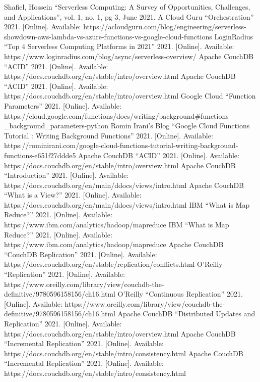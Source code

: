 \documentclass[10pt, conference]{IEEEtran}
\begin{document}
\begin{thebibliography}{00}
 Shafiel, Hossein ``Serverless Computing: A Survey of Opportunities,
Challenges, and Applications'', vol. 1, no. 1, pg 3, June 2021. 
 A Cloud Guru ``Orchestration” 2021. [Online]. Available: https://acloudguru.com/blog/engineering/serverless-showdown-aws-lambda-vs-azure-functions-vs-google-cloud-functions
 LoginRadius ``Top 4 Serverless Computing Platforms in 2021” 2021. [Online]. Available:  https://www.loginradius.com/blog/async/serverless-overview/
 Apache CouchDB ``ACID” 2021. [Online]. Available:  https://docs.couchdb.org/en/stable/intro/overview.html 
 Apache CouchDB ``ACID” 2021. [Online]. Available:  https://docs.couchdb.org/en/stable/intro/overview.html 
 Google Cloud ``Function Parameters” 2021. [Online]. Available:  https://cloud.google.com/functions/docs/writing/background\#functions \_background\_parameters-python
 Romin Irani’s Blog ``Google Cloud Functions Tutorial : Writing Background Functions” 2021. [Online]. Available:  https://rominirani.com/google-cloud-functions-tutorial-writing-background-functions-e651f27ddde5
 Apache CouchDB “ACID” 2021. [Online]. Available:  https://docs.couchdb.org/en/stable/intro/overview.html 
 Apache CouchDB “Introduction” 2021. [Online]. Available: https://docs.couchdb.org/en/main/ddocs/views/intro.html
 Apache CouchDB “What is a View?” 2021. [Online]. Available: https://docs.couchdb.org/en/main/ddocs/views/intro.html
 IBM “What is Map Reduce?” 2021. [Online]. Available: https://www.ibm.com/analytics/hadoop/mapreduce
 IBM “What is Map Reduce?” 2021. [Online]. Available: https://www.ibm.com/analytics/hadoop/mapreduce
 Apache CouchDB “CouchDB Replication” 2021. [Online]. Available: https://docs.couchdb.org/en/stable/replication/conflicts.html
 O'Reilly “Replication” 2021. [Online]. Available:  https://www.oreilly.com/library/view/couchdb-the-definitive/9780596158156/ch16.html 
 O'Reilly “Continuous Replication” 2021. [Online]. Available: https://www.oreilly.com/library/view/couchdb-the-definitive/9780596158156/ch16.html 
 Apache CouchDB “Distributed Updates and Replication” 2021. [Online]. Available: https://docs.couchdb.org/en/stable/intro/overview.html
 Apache CouchDB “Incremental Replication” 2021. [Online]. Available: https://docs.couchdb.org/en/stable/intro/consistency.html
 Apache CouchDB “Incremental Replication” 2021. [Online]. Available: https://docs.couchdb.org/en/stable/intro/consistency.html

\end{thebibliography}
\end{document}

